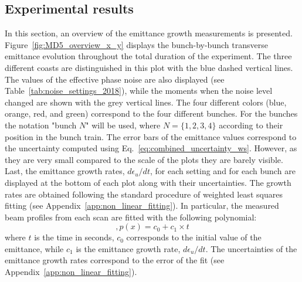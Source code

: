 \subsection{Experimental results}\label{sec:MD5_overview}
In this section, an overview of the emittance growth measurements is presented. Figure~\ref{fig:MD5_overview_x_y} displays the bunch-by-bunch transverse emittance evolution throughout the total duration of the experiment. The three different coasts are distinguished in this plot with the blue dashed vertical lines. The values of the effective phase noise are also displayed (see Table~\ref{tab:noise_settings_2018}), while the moments when the noise level changed are shown with the grey vertical lines. The four different colors (blue, orange, red, and green) correspond to the four different bunches. For the bunches the notation "bunch $N$" will be used, where $N=\{1,2,3,4\}$ according to their position in the bunch train. The error bars of the emittance values correspond to the uncertainty computed using Eq.~\ref{eq:combined_uncertainty_ws}. However, as they are very small compared to the scale of the plots they are barely visible. Last, the emittance growth rates, $d\epsilon_u /dt$, for each setting and for each bunch are displayed at the bottom of each plot along with their uncertainties. The growth rates are obtained following the standard procedure of weighted least squares fitting (see Appendix~\ref{app:non_linear_fitting}). In particular, the measured beam profiles from each scan are fitted with the following polynomial:
\begin{equation}\label{eq:polynimial_for_linear_fit},
   p(x) = c_0 + c_1 \times t
\end{equation}
where $t$ is the time in seconds, %
$c_0$ corresponds to the initial value of the emittance, while $c_1$ is the emittance growth rate, $d\epsilon_u /dt$. The uncertainties of the emittance growth rates correspond to the error of the fit (see Appendix~\ref{app:non_linear_fitting}).

